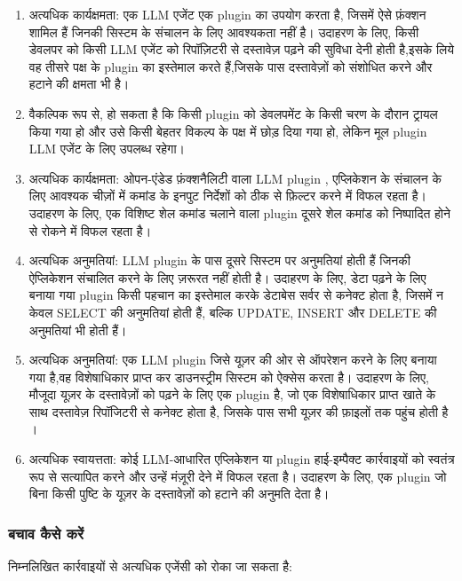 \documentclass[
]{article}
\providecommand{\tightlist}{%
  \setlength{\itemsep}{0pt}\setlength{\parskip}{0pt}}
\begin{document}
\begin{enumerate}
\def\labelenumi{\arabic{enumi}.}
\tightlist
\item
  अत्यधिक कार्यक्षमता: एक LLM एजेंट एक plugin का उपयोग करता है, जिसमें ऐसे फ़ंक्शन
  शामिल हैं जिनकी सिस्टम के संचालन के लिए आवश्यकता नहीं है। उदाहरण के लिए, किसी
  डेवलपर को किसी LLM एजेंट को रिपॉज़िटरी से दस्तावेज़ पढ़ने की सुविधा देनी होती
  है,इसके लिये वह तीसरे पक्ष के plugin का इस्तेमाल करते हैं,जिसके पास दस्तावेज़ों को
  संशोधित करने और हटाने की क्षमता भी है।
\item
  वैकल्पिक रूप से, हो सकता है कि किसी plugin को डेवलपमेंट के किसी चरण के दौरान
  ट्रायल किया गया हो और उसे किसी बेहतर विकल्प के पक्ष में छोड़ दिया गया हो, लेकिन
  मूल plugin LLM एजेंट के लिए उपलब्ध रहेगा।
\item
  अत्यधिक कार्यक्षमता: ओपन-एंडेड फ़ंक्शनैलिटी वाला LLM plugin , एप्लिकेशन के संचालन के
  लिए आवश्यक चीज़ों में कमांड के इनपुट निर्देशों को ठीक से फ़िल्टर करने में विफल रहता है।
  उदाहरण के लिए, एक विशिष्ट शेल कमांड चलाने वाला plugin दूसरे शेल कमांड को
  निष्पादित होने से रोकने में विफल रहता है।
\item
  अत्यधिक अनुमतियां: LLM plugin के पास दूसरे सिस्टम पर अनुमतियां होती हैं जिनकी
  ऐप्लिकेशन संचालित करने के लिए ज़रूरत नहीं होती है। उदाहरण के लिए, डेटा पढ़ने के लिए
  बनाया गया plugin किसी पहचान का इस्तेमाल करके डेटाबेस सर्वर से कनेक्ट होता है,
  जिसमें न केवल SELECT की अनुमतियां होती हैं, बल्कि UPDATE, INSERT और DELETE की
  अनुमतियां भी होती हैं।
\item
  अत्यधिक अनुमतियां: एक LLM plugin जिसे यूज़र की ओर से ऑपरेशन करने के लिए बनाया
  गया है,वह विशेषाधिकार प्राप्त कर डाउनस्ट्रीम सिस्टम को ऐक्सेस करता है। उदाहरण के
  लिए, मौजूदा यूज़र के दस्तावेज़ों को पढ़ने के लिए एक plugin है, जो एक विशेषाधिकार
  प्राप्त खाते के साथ दस्तावेज़ रिपॉजिटरी से कनेक्ट होता है, जिसके पास सभी यूज़र की
  फ़ाइलों तक पहुंच होती है ।
\item
  अत्यधिक स्वायत्तता: कोई LLM-आधारित एप्लिकेशन या plugin हाई-इम्पैक्ट कार्रवाइयों
  को स्वतंत्र रूप से सत्यापित करने और उन्हें मंज़ूरी देने में विफल रहता है। उदाहरण के लिए,
  एक plugin जो बिना किसी पुष्टि के यूज़र के दस्तावेज़ों को हटाने की अनुमति देता है।
\end{enumerate}

\subsubsection{बचाव कैसे करें}\label{ux92cux91aux935-ux915ux938-ux915ux930}

निम्नलिखित कार्रवाइयों से अत्यधिक एजेंसी को रोका जा सकता है:
\end{document}
